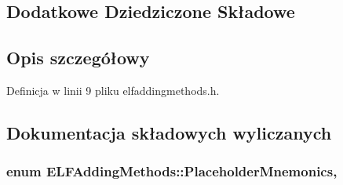 \subsection*{Dodatkowe Dziedziczone Składowe}


\subsection{Opis szczegółowy}


Definicja w linii 9 pliku elfaddingmethods.\-h.



\subsection{Dokumentacja składowych wyliczanych}
\hypertarget{class_e_l_f_adding_methods_a666b28eeb9569323a4f697d37c6a1022}{
\subsubsection[{Placeholder\-Mnemonics}]{\setlength{\rightskip}{0pt plus 5cm}enum {\bf E\-L\-F\-Adding\-Methods\-::\-Placeholder\-Mnemonics}\hspace{0.3cm}{\ttfamily [strong]}, {\ttfamily [private]}}}\label{class_e_l_f_adding_methods_a666b28eeb9569323a4f697d37c6a1022}
